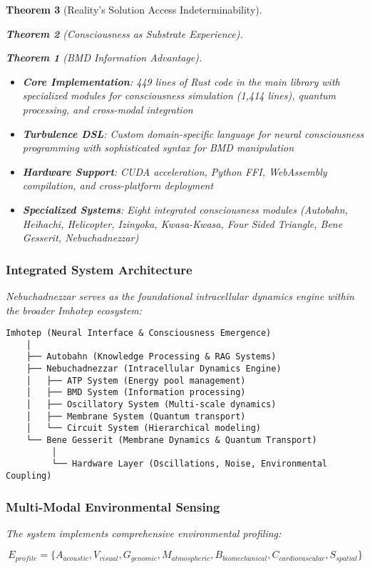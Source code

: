 \documentclass[12pt,a4paper]{article}
\newtheorem{theorem}{Theorem}[section]
\theoremstyle{remark}
\begin{document}
\begin{theorem}[Reality's Solution Access Indeterminability]
\begin{theorem}[Consciousness as Substrate Experience]
\begin{theorem}[BMD Information Advantage]
{{{\begin{itemize}
\item \textbf{Core Implementation}: 449 lines of Rust code in the main library with specialized modules for consciousness simulation (1,414 lines), quantum processing, and cross-modal integration
\item \textbf{Turbulence DSL}: Custom domain-specific language for neural consciousness programming with sophisticated syntax for BMD manipulation
\item \textbf{Hardware Support}: CUDA acceleration, Python FFI, WebAssembly compilation, and cross-platform deployment
\item \textbf{Specialized Systems}: Eight integrated consciousness modules (Autobahn, Heihachi, Helicopter, Izinyoka, Kwasa-Kwasa, Four Sided Triangle, Bene Gesserit, Nebuchadnezzar)
\end{itemize}

\subsubsection{Integrated System Architecture}

Nebuchadnezzar serves as the foundational intracellular dynamics engine within the broader Imhotep ecosystem:

\begin{verbatim}
Imhotep (Neural Interface & Consciousness Emergence)
    │
    ├── Autobahn (Knowledge Processing & RAG Systems)
    ├── Nebuchadnezzar (Intracellular Dynamics Engine)
    │   ├── ATP System (Energy pool management)
    │   ├── BMD System (Information processing)
    │   ├── Oscillatory System (Multi-scale dynamics)
    │   ├── Membrane System (Quantum transport)
    │   └── Circuit System (Hierarchical modeling)
    └── Bene Gesserit (Membrane Dynamics & Quantum Transport)
         │
         └── Hardware Layer (Oscillations, Noise, Environmental Coupling)
\end{verbatim}

\subsubsection{Multi-Modal Environmental Sensing}

The system implements comprehensive environmental profiling:

\begin{equation}
E_{profile} = \{A_{acoustic}, V_{visual}, G_{genomic}, M_{atmospheric}, B_{biomechanical}, C_{cardiovascular}, S_{spatial}\}
\end{equation}

}}}
\end{theorem}
\end{theorem}
\end{theorem}
\end{document}
